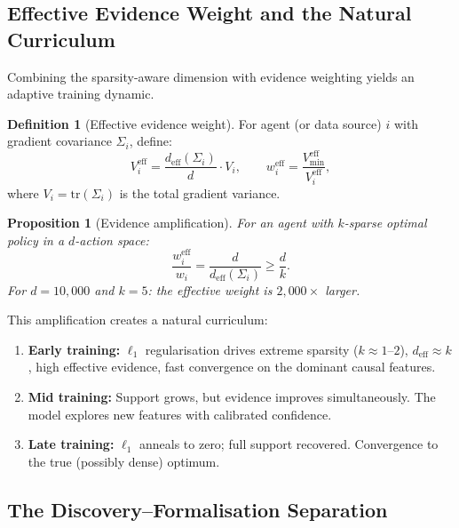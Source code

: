 \documentclass[11pt,a4paper]{article}
\theoremstyle{plain}
\newtheorem{proposition}[theorem]{Proposition}
\theoremstyle{definition}
\newtheorem{definition}[theorem]{Definition}
\theoremstyle{remark}
\newcommand{\deff}{d_{\mathrm{eff}}}
\newcommand{\tr}{\mathrm{tr}}
\begin{document}
\subsection{Effective Evidence Weight and the Natural Curriculum}%
\label{sec:evidence}

Combining the sparsity-aware dimension with evidence weighting yields an
adaptive training dynamic.

\begin{definition}[Effective evidence weight]
For agent (or data source) $i$ with gradient covariance $\Sigma_i$, define:
\begin{equation}\label{eq:eff-evidence}
  V_i^{\mathrm{eff}} = \frac{\deff(\Sigma_i)}{d}\cdot V_i,
  \qquad
  w_i^{\mathrm{eff}} = \frac{V_{\min}^{\mathrm{eff}}}{V_i^{\mathrm{eff}}},
\end{equation}
where $V_i = \tr(\Sigma_i)$ is the total gradient variance.
\end{definition}

\begin{proposition}[Evidence amplification]\label{prop:evidence-amp}
For an agent with $k$-sparse optimal policy in a $d$-action space:
\begin{equation}\label{eq:evidence-amp}
  \frac{w_i^{\mathrm{eff}}}{w_i} = \frac{d}{\deff(\Sigma_i)} \geq \frac{d}{k}.
\end{equation}
For $d = 10{,}000$ and $k = 5$: the effective weight is $2{,}000\times$ larger.
\end{proposition}

This amplification creates a natural curriculum:
\begin{enumerate}[leftmargin=2em]
  \item \textbf{Early training:} $\ell_1$ regularisation drives extreme sparsity
    ($k \approx 1$--$2$), $\deff \approx k$, high effective evidence, fast
    convergence on the dominant causal features.
  \item \textbf{Mid training:} Support grows, but evidence improves
    simultaneously.  The model explores new features with calibrated confidence.
  \item \textbf{Late training:} $\ell_1$ anneals to zero; full support recovered.
    Convergence to the true (possibly dense) optimum.
\end{enumerate}


\subsection{The Discovery--Formalisation Separation}%
\label{sec:discovery-formalisation}
\end{document}
